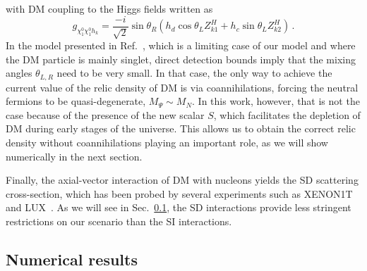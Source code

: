 \documentclass[12pt,letterpaper]{article}
\begin{document}
with DM coupling to the Higgs fields written as
\begin{equation}
g_{\chi_1^0\chi_1^0 h_k} = \dfrac{-i}{\sqrt{2}}\sin\theta_R\left(h_d\cos\theta_L Z^H_{k1} + h_c\sin\theta_L Z^H_{k2}\right)\,.
\end{equation}
In the model presented in Ref.~\cite{Yaguna:2015mva}, which is a limiting case of our model and where the DM particle is mainly singlet, direct detection bounds imply that the mixing angles $\theta_{L,R}$ need to be very small. In that case, the only way to achieve the current value of the relic density of DM is via coannihilations, forcing the neutral fermions to be quasi-degenerate, $M_{\Psi} \sim M_N$. In this work, however,  that is not the case because of the presence of the new scalar $S$, which facilitates the depletion of DM during early stages of the universe. This allows us to obtain the correct relic density without coannihilations playing an important role, as we will show numerically in the next section. 

Finally, the axial-vector interaction of DM with nucleons yields the SD scattering cross-section, which has been probed by several experiments such as XENON1T~\cite{Aprile:2019dbj} and LUX~\cite{Akerib:2017kat}. As we will see in Sec.~\ref{sec:scan}, the SD interactions provide less stringent restrictions on our scenario than the SI interactions.


\subsection{Numerical results}
\label{sec:scan}
\end{document}
